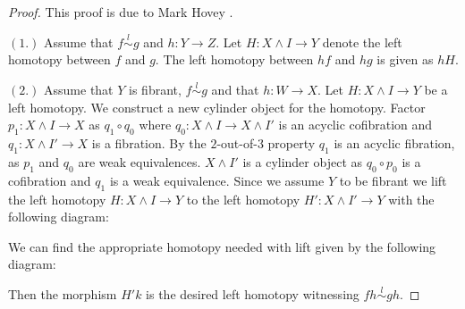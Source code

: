 \documentclass[../thesis.tex]{subfiles}
\begin{document}
            \begin{proof}
                This proof is due to Mark Hovey .

                $(1.)$ Assume that $f \overset{l}{\sim} g$ and $h:Y\rightarrow Z$. Let $H:X\wedge I \rightarrow Y$ denote the left homotopy between $f$ and $g$. The left homotopy between $hf$ and $hg$ is given as $hH$.

                $(2.)$ Assume that $Y$ is fibrant, $f \overset{l}{\sim} g$ and that $h:W\rightarrow X$. Let $H:X\wedge I\rightarrow Y$ be a left homotopy. We construct a new cylinder object for the homotopy. Factor $p_1:X\wedge I \rightarrow X$ as $q_1\circ q_0$ where $q_0: X\wedge I \rightarrow X\wedge I'$ is an acyclic cofibration and $q_1:X\wedge I'\rightarrow X$ is a fibration. By the $2$-out-of-$3$ property $q_1$ is an acyclic fibration, as $p_1$ and $q_0$ are weak equivalences. $X\wedge I'$ is a cylinder object as $q_0\circ p_0$ is a cofibration and $q_1$ is a weak equivalence. Since we assume $Y$ to be fibrant we lift the left homotopy $H:X\wedge I\rightarrow Y$ to the left homotopy $H':X\wedge I'\rightarrow Y$ with the following diagram:
                \begin{center}
                \end{center}
                We can find the appropriate homotopy needed with lift given by the following diagram:
                \begin{center}
                \end{center}
                Then the morphism $H'k$ is the desired left homotopy witnessing $fh \overset{l}{\sim} gh$.


\end{proof}
\end{document}
